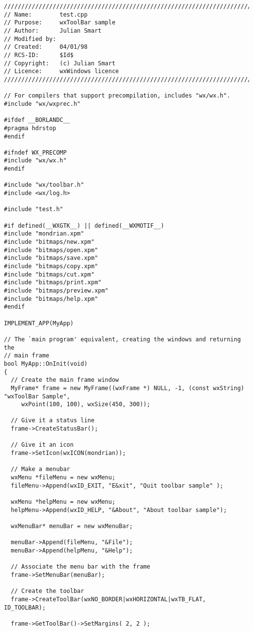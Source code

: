 {\small
\begin{verbatim}
/////////////////////////////////////////////////////////////////////////////
// Name:        test.cpp
// Purpose:     wxToolBar sample
// Author:      Julian Smart
// Modified by:
// Created:     04/01/98
// RCS-ID:      $Id$
// Copyright:   (c) Julian Smart
// Licence:   	wxWindows licence
/////////////////////////////////////////////////////////////////////////////

// For compilers that support precompilation, includes "wx/wx.h".
#include "wx/wxprec.h"

#ifdef __BORLANDC__
#pragma hdrstop
#endif

#ifndef WX_PRECOMP
#include "wx/wx.h"
#endif

#include "wx/toolbar.h"
#include <wx/log.h>

#include "test.h"

#if defined(__WXGTK__) || defined(__WXMOTIF__)
#include "mondrian.xpm"
#include "bitmaps/new.xpm"
#include "bitmaps/open.xpm"
#include "bitmaps/save.xpm"
#include "bitmaps/copy.xpm"
#include "bitmaps/cut.xpm"
#include "bitmaps/print.xpm"
#include "bitmaps/preview.xpm"
#include "bitmaps/help.xpm"
#endif

IMPLEMENT_APP(MyApp)

// The `main program' equivalent, creating the windows and returning the
// main frame
bool MyApp::OnInit(void)
{
  // Create the main frame window
  MyFrame* frame = new MyFrame((wxFrame *) NULL, -1, (const wxString) "wxToolBar Sample",
     wxPoint(100, 100), wxSize(450, 300));

  // Give it a status line
  frame->CreateStatusBar();

  // Give it an icon
  frame->SetIcon(wxICON(mondrian));

  // Make a menubar
  wxMenu *fileMenu = new wxMenu;
  fileMenu->Append(wxID_EXIT, "E&xit", "Quit toolbar sample" );

  wxMenu *helpMenu = new wxMenu;
  helpMenu->Append(wxID_HELP, "&About", "About toolbar sample");

  wxMenuBar* menuBar = new wxMenuBar;

  menuBar->Append(fileMenu, "&File");
  menuBar->Append(helpMenu, "&Help");

  // Associate the menu bar with the frame
  frame->SetMenuBar(menuBar);

  // Create the toolbar
  frame->CreateToolBar(wxNO_BORDER|wxHORIZONTAL|wxTB_FLAT, ID_TOOLBAR);
  
  frame->GetToolBar()->SetMargins( 2, 2 );


\end{verbatim}}
